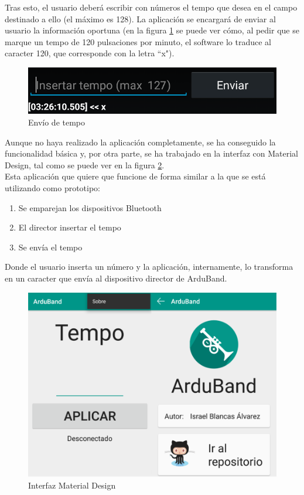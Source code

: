 Tras esto, el usuario deberá escribir con números el tempo que desea en el campo
destinado a ello (el máximo es 128). La aplicación se encargará de enviar al usuario
la información oportuna (en la figura \ref{fig:protoand3} se puede ver cómo, al
pedir que se marque un tempo de 120 pulsaciones por minuto, el software lo traduce al caracter
120, que corresponde con la letra ``x").\\

\begin{figure}[!htb]
\centering
\includegraphics[width=1\textwidth]{./imagenes/arduband-android-prototipo3}
\caption{Envío de tempo} \label{fig:protoand3}
\end{figure}

Aunque no haya realizado la aplicación completamente, se ha conseguido la funcionalidad básica y,
por otra parte, se ha trabajado en la interfaz con Material Design, tal como se puede ver en la
figura \ref{fig:material}.\\

Esta aplicación que quiere que funcione de forma similar a la que se está utilizando como
prototipo:
\begin{enumerate}
  \item Se emparejan los dispositivos Bluetooth
  \item El director insertar el tempo
  \item Se envía el tempo
\end{enumerate}

Donde el usuario inserta un número y la aplicación, internamente, lo transforma en un
caracter que envía al dispositivo director de ArduBand.\\

\begin{figure}[!htb]
\centering
\includegraphics[width=1\textwidth]{./imagenes/material}
\caption{Interfaz Material Design} \label{fig:material}
\end{figure}

